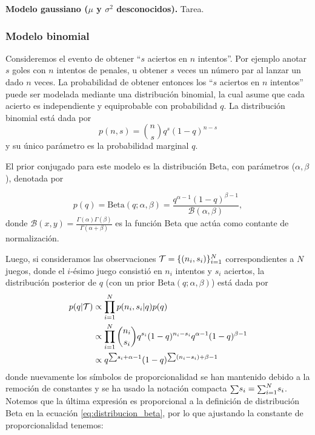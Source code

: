 \textbf{Modelo gaussiano ($\mu$ y $\sigma^2$ desconocidos).} Tarea. 

\subsubsection{Modelo binomial}

Consideremos el evento de obtener ``$s$ aciertos en $n$ intentos''. Por ejemplo anotar $s$ goles con $n$ intentos de penales, u obtener $s$ veces un número par al lanzar un dado $n$ veces. La probabilidad de obtener entonces los ``$s$ aciertos en $n$ intentos'' puede ser modelada mediante una distribución binomial, la cual asume que cada acierto es independiente y  equiprobable con probabilidad $q$. La distribución binomial está dada por
\begin{equation}
	p(n, s) = \binom{n}{s} q^s (1-q)^{n-s}
\end{equation}
y su único parámetro es la probabilidad marginal $q$.

El prior conjugado para este modelo es la distribución Beta, con parámetros ($\alpha, \beta$), denotada por 

\begin{equation}
	p(q) = \text{Beta}(q;\alpha,\beta) = \frac{q^{\alpha-1}(1-q)^{\beta-1}}{\mathcal{B}(\alpha, \beta)},
	\label{eq:distribucion_beta}
\end{equation}
donde $\mathcal{B}(x,y) = \frac{\Gamma(\alpha)\Gamma(\beta)}{\Gamma(\alpha+\beta)}$ es la función Beta que actúa como contante de normalización.


Luego, si consideramos las observaciones ${\mathcal T} = \{(n_i,s_i)\}_{i=1}^N$ correspondientes a $N$ juegos, donde el $i$-ésimo juego consistió en $n_i$ intentos y $s_i$ aciertos, la distribución posterior de $q$ (con un prior $\text{Beta}(q;\alpha,\beta)$) está dada por
\begin{align}
	p(q|{\mathcal T}) & 	\propto \prod_{i=1}^N  p(n_i,s_i|q)p(q)  \\
			 & \propto  \prod_{i=1}^N\binom{n_i}{s_i}q^{s_i}(1-q)^{n_i-s_i}q^{\alpha-1}(1-q)^{\beta-1} \nonumber\\
			 & \propto  q^{{\scriptstyle\sum} s_i + \alpha - 1}(1-q)^{{\scriptstyle\sum} (n_i-s_i) + \beta-1} \nonumber
\end{align}
donde nuevamente los símbolos de proporcionalidad se han mantenido debido a la remoción de constantes y se ha usado la notación compacta ${\scriptstyle\sum} s_i = {\scriptstyle\sum}_{i=1}^N s_i$. Notemos que la última expresión es proporcional a la definición de distribución Beta en la ecuación \eqref{eq:distribucion_beta}, por lo que ajustando la constante de proporcionalidad tenemos: 

